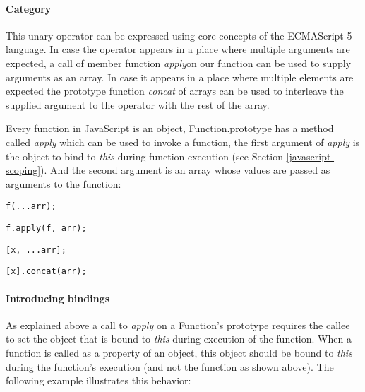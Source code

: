 \paragraph{Category}
This unary operator can be expressed using core concepts of the ECMAScript 5 language. In case the operator appears in a place where multiple arguments are expected, a call of member function \textit{apply}\footnotemark on our function can be used to supply arguments as an array. In case it appears in a place where multiple elements are expected the prototype function \textit{concat} of arrays can be used to interleave the supplied argument to the operator with the rest of the array. 


Every function in JavaScript is an object, Function.prototype has a method called \textit{apply} which can be used to invoke a function, the first argument of \textit{apply} is the object to bind to \textit{this} during function execution (see Section \ref{javascript-scoping}). And the second argument is an array whose values are passed as arguments to the function:

\begin{minipage}{0.45\textwidth}
\begin{lstlisting}
f(...arr);
\end{lstlisting}
\end{minipage}
\hfill
\begin{minipage}{0.45\textwidth}
\begin{lstlisting}
f.apply(f, arr);
\end{lstlisting}
\end{minipage}

\begin{minipage}{0.45\textwidth}
\begin{lstlisting}
[x, ...arr];
\end{lstlisting}
\end{minipage}
\hfill
\begin{minipage}{0.45\textwidth}
\begin{lstlisting}
[x].concat(arr);
\end{lstlisting}
\end{minipage}

\paragraph{Introducing bindings} \label{spread-intoducing-bindings}
As explained above a call to \textit{apply} on a Function's prototype requires the callee to set the object that is bound to \textit{this} during execution of the function. When a function is called as a property of an object, this object should be bound to \textit{this} during the function's execution (and not the function as shown above). The following example illustrates this behavior:

